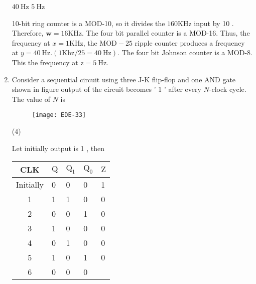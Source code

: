 \begin{enumerate}
\begin{tasks}
		\task[\textbf{c.}]$40 \mathrm{~Hz}$
		\task[\textbf{d.}] $5 \mathrm{~Hz}$
	\end{tasks}
	\begin{answer}
		10-bit ring counter is a MOD-10, so it divides the $160 \mathrm{KHz}$ input by 10 . Therefore, $\mathbf{w}=16 \mathrm{KHz}$. The four bit parallel counter is a MOD-16. Thus, the frequency at $x=1 \mathrm{KHz}$, the $\mathrm{MOD}-25$ ripple counter produces a frequency at $y=40 \mathrm{~Hz} .(1 \mathrm{Khz} / 25=40 \mathrm{~Hz})$. The four bit Johnson counter is a MOD-8. This the frequency at $\mathrm{z}=5 \mathrm{~Hz}$.
	\end{answer}
	\item Consider a sequential circuit using three J-K flip-flop and one AND gate shown in figure output of the circuit becomes ' 1 ' after every $N$-clock cycle. The value of $N$ is
	\begin{figure}[H]
		\centering
		\texttt{[image: EDE-33]}
	\end{figure}
	\begin{tasks}(4)
	\end{tasks}
	\begin{answer}
		Let initially output is 1 , then\\
		\begin{tabular}{|cllll|}
			\hline CLK & $\mathrm{Q}$ & $\mathrm{Q}_{1}$ & $\mathrm{Q}_{0}$ & $\mathrm{Z}$ \\
			\hline Initially & 0 & 0 & 0 & 1 \\
			\hline 1 & 1 & 1 & 0 & 0 \\
			2 & 0 & 0 & 1 & 0 \\
			3 & 1 & 0 & 0 & 0 \\
			4 & 0 & 1 & 0 & 0 \\
			5 & 1 & 0 & 1 & 0 \\
			6 & 0 & 0 & 0 & \\
			\hline
		\end{tabular}
	\end{answer}
	

	
\end{enumerate}